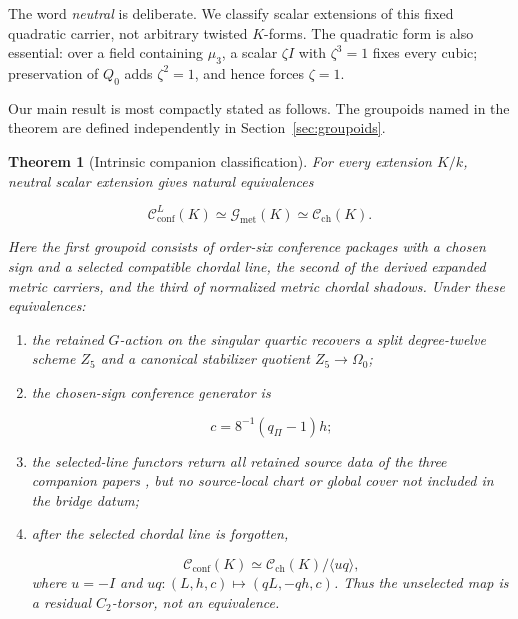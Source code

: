 \documentclass[11pt]{article}
\newtheorem{theorem}{Theorem}[section]
\theoremstyle{definition}
\theoremstyle{remark}
\newcommand{\cC}{\mathscr C}
\newcommand{\cG}{\mathscr G}
\begin{document}
The word \emph{neutral} is deliberate.  We classify scalar extensions of this
fixed quadratic carrier, not arbitrary twisted \(K\)-forms.  The quadratic
form is also essential: over a field containing \(\mu_3\), a scalar
\(\zeta I\) with \(\zeta^3=1\) fixes every cubic; preservation of \(Q_0\)
adds \(\zeta^2=1\), and hence forces \(\zeta=1\).

Our main result is most compactly stated as follows.  The groupoids named in
the theorem are defined independently in Section~\ref{sec:groupoids}.

\begin{theorem}[Intrinsic companion classification]
\label{thm:intrinsic-companion-classification}
For every extension \(K/k\), neutral scalar extension gives natural
equivalences

\[
 \cC_{\mathrm{conf}}^{L}(K)
   \simeq \cG_{\mathrm{met}}(K)
   \simeq \cC_{\mathrm{ch}}(K).
\]

Here the first groupoid consists of order-six conference packages with a
chosen sign and a selected compatible chordal line, the second of the derived expanded
metric carriers, and the third of normalized metric chordal shadows.  Under
these equivalences:

\begin{enumerate}[label=\textup{(\roman*)},leftmargin=2.4em]
\item the retained \(G\)-action on the singular quartic recovers a split
  degree-twelve scheme \(Z_5\) and a canonical stabilizer quotient
  \(Z_5\to\Omega_0\);
\item the chosen-sign conference generator is

  \[
                        c=8^{-1}(q_\Pi-1)h;
  \]
\item the selected-line functors return all retained source data of the three
  companion papers
  \cite{RuddRigidity2026,RuddFactorization2026,RuddPassages2026}, but no
  source-local chart or global cover not included in the bridge datum;
\item after the selected chordal line is forgotten,

  \[
     \cC_{\mathrm{conf}}(K)
       \simeq \cC_{\mathrm{ch}}(K)/\langle uq\rangle,
  \]
  where \(u=-I\) and \(uq:(L,h,c)\mapsto(qL,-qh,c)\).  Thus the unselected
  map is a residual \(C_2\)-torsor, not an equivalence.
\end{enumerate}
\end{theorem}
\end{document}
